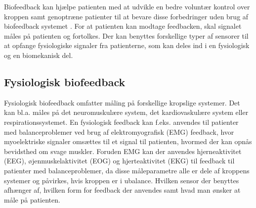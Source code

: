 Biofeedback kan hjælpe patienten med at udvikle en bedre voluntær kontrol over kroppen samt genoptræne patienter til at bevare disse forbedringer uden brug af biofeedback systemet \cite{Prentice2007}.  For at patienten kan modtage feedbacken, skal signalet måles på patienten og fortolkes. Der kan benyttes forskellige typer af sensorer til at opfange fysiologiske signaler fra patienterne, som kan deles ind i en fysiologisk og en biomekanisk del. \cite{Giggins2013}

\subsection{Fysiologisk biofeedback}
Fysiologisk biofeedback omfatter måling på forskellige kropslige systemer. Det kan bl.a. måles på det neuromuskulære system, det kardiovaskulære system eller respirationssystemet.  En fysiologisk feedback kan f.eks. anvendes til patienter med balanceproblemer ved brug af elektromyografisk (EMG) feedback, hvor myoelektriske signaler omsættes til et signal til patienten,  hvormed der kan opnås bevidsthed om svage muskler. Foruden EMG kan der anvendes hjerneaktivitet (EEG), øjenmuskelaktivitet (EOG) og hjerteaktivitet (EKG) til feedback til patienter med balanceproblemer, da disse måleparametre alle er dele af kroppens systemer og påvirkes, hvis kroppen er i ubalance. Hvilken sensor der benyttes afhænger af, hvilken form for feedback der anvendes samt hvad man ønsker at måle på patienten. \cite{Prentice2007} 


